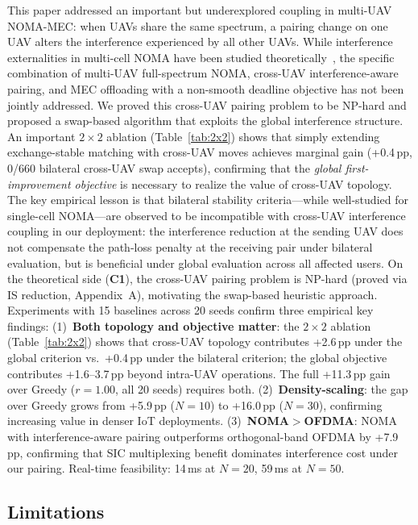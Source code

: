 \documentclass[journal]{IEEEtran}
\begin{document}
This paper addressed an important but underexplored coupling in multi-UAV NOMA-MEC: when UAVs share the same spectrum, a pairing change on one UAV alters the interference experienced by all other UAVs.
While interference externalities in multi-cell NOMA have been studied theoretically~\cite{shin2017non,hamidouche2017matching}, the specific combination of multi-UAV full-spectrum NOMA, cross-UAV interference-aware pairing, and MEC offloading with a non-smooth deadline objective has not been jointly addressed.
We proved this cross-UAV pairing problem to be NP-hard and proposed a swap-based algorithm that exploits the global interference structure.
An important $2\!\times\!2$ ablation (Table~\ref{tab:2x2}) shows that simply extending exchange-stable matching with cross-UAV moves achieves marginal gain (+0.4\,pp, 0/660 bilateral cross-UAV swap accepts), confirming that the \emph{global first-improvement objective} is necessary to realize the value of cross-UAV topology.
The key empirical lesson is that bilateral stability criteria---while well-studied for single-cell NOMA---are observed to be incompatible with cross-UAV interference coupling in our deployment: the interference reduction at the sending UAV does not compensate the path-loss penalty at the receiving pair under bilateral evaluation, but is beneficial under global evaluation across all affected users.
On the theoretical side (\textbf{C1}), the cross-UAV pairing problem is NP-hard (proved via IS reduction, Appendix~A), motivating the swap-based heuristic approach.
Experiments with 15 baselines across 20 seeds confirm three empirical key findings:
(1)~\textbf{Both topology and objective matter}: the $2\!\times\!2$ ablation (Table~\ref{tab:2x2}) shows that cross-UAV topology contributes +2.6\,pp under the global criterion vs.\ +0.4\,pp under the bilateral criterion; the global objective contributes +1.6--3.7\,pp beyond intra-UAV operations. The full +11.3\,pp gain over Greedy ($r\!=\!1.00$, all 20 seeds) requires both.
(2)~\textbf{Density-scaling}: the gap over Greedy grows from +5.9\,pp ($N\!=\!10$) to +16.0\,pp ($N\!=\!30$), confirming increasing value in denser IoT deployments.
(3)~\textbf{NOMA$>$OFDMA}: NOMA with interference-aware pairing outperforms orthogonal-band OFDMA by +7.9\,pp, confirming that SIC multiplexing benefit dominates interference cost under our pairing.
Real-time feasibility: 14\,ms at $N\!=\!20$, 59\,ms at $N\!=\!50$.

\subsection*{Limitations}
\end{document}
